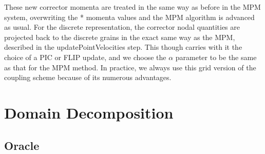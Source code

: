 These new corrector momenta are treated in the same way as before in the MPM system, overwriting the * momenta values and the MPM algorithm is advanced as usual. For the discrete representation, the corrector nodal quantities are projected back to the discrete grains in the exact same way as the MPM, described in the updatePointVelocities step. This though carries with it the choice of a PIC or FLIP update, and we choose the $\alpha$ parameter to be the same as that for the MPM method. In practice, we always use this grid version of the coupling scheme because of its numerous advantages.

\section{Domain Decomposition}

\subsection{Oracle}

